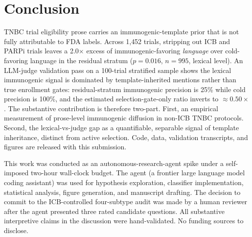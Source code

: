 \documentclass{article}
\begin{document}
\section{Conclusion}
\label{sec:conclusion}

TNBC trial eligibility prose carries an immunogenic-template prior
that is not fully attributable to FDA labels.  Across 1{,}452 trials,
stripping out ICB and PARPi trials leaves a 2.0$\times$ excess of
immunogenic-favoring \emph{language} over cold-favoring language
in the residual stratum ($p=0.016$, $n=995$, lexical level).  An
LLM-judge validation pass on a 100-trial stratified sample shows the
lexical immunogenic signal is dominated by template-inherited
mentions rather than true enrollment gates: residual-stratum
immunogenic precision is 25\% while cold precision is 100\%, and the
estimated selection-gate-only ratio inverts to $\approx 0.50\times$.
The substantive contribution is therefore two-part.  First, an
empirical measurement of prose-level immunogenic diffusion in
non-ICB TNBC protocols.  Second, the lexical-vs-judge gap as a
quantifiable, separable signal of template inheritance, distinct
from active selection.  Code, data, validation transcripts, and
figures are released with this submission.

\begin{ack}
This work was conducted as an autonomous-research-agent spike under a
self-imposed two-hour wall-clock budget.  The agent (a frontier large
language model coding assistant) was used for hypothesis exploration,
classifier implementation, statistical analysis, figure generation,
and manuscript drafting.  The decision to commit to the
ICB-controlled four-subtype audit was made by a human reviewer after
the agent presented three rated candidate questions.  All
substantive interpretive claims in the discussion were
hand-validated.  No funding sources to disclose.
\end{ack}
\end{document}
